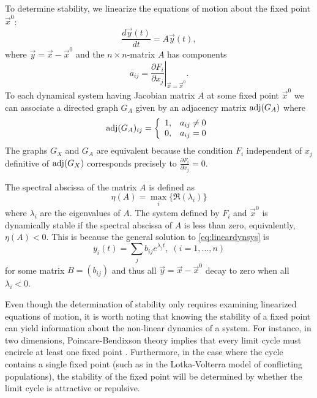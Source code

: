 To determine stability, we linearize the equations of motion about the
fixed point $\vec{x}^0$:
\begin{equation}\label{eq:lineardynsys}
\frac{d\vec{y}(t)}{dt} = A \vec{y}(t),
\end{equation}
where $\vec{y} = \vec{x} - \vec{x}^0$ and the $n \times n$-matrix $A$ has components
$$
a_{ij} = \left. \frac{\partial F_i}{\partial x_j} \right|_{\vec{x} = \vec{x}^0}.
$$
To each dynamical system having Jacobian matrix $A$ at some fixed point $\vec{x}^0$ we can associate a directed graph $G_A$ given by an adjacency matrix $\mathrm{adj}(G_A)$ where
 \begin{displaymath}
   \mathrm{adj}(G_A)_{ij} = \left\{
     \begin{array}{lr}
       1, & a_{ij} \neq 0\\
       0, & a_{ij} = 0
     \end{array}
   \right.
\end{displaymath}
The graphs $G_X$ and $G_A$ are equivalent because the condition $F_i$ independent of $x_j$ definitive of $\mathrm{adj}(G_X)$ corresponds precisely to $\frac{\partial F_i}{\partial x_j}=0$.

The spectral abscissa of the matrix $A$ is defined as
$$
\eta(A) = \max_i \{\Re(\lambda_i)\}
$$
where $\lambda_i$ are the eigenvalues of $A$. The system defined by $F_i$ and $\vec{x}^0$ is dynamically stable if the spectral abscissa of $A$ is less than zero, equivalently, $\eta(A) < 0$. This is because the general solution to \ref{eq:lineardynsys} is
$$
y_i(t) = \sum_j b_{ij} e^{\lambda_j t}, \; (i=1,\ldots,n)
$$
for some matrix $B=(b_{ij})$ and thus all $\vec{y} = \vec{x} - \vec{x}^0$ decay to zero when all $\lambda_i < 0$.

Even though the determination of stability only requires examining
linearized equations of motion, it is worth noting that knowing the
stability of a fixed point can yield information about the non-linear
dynamics of a system.  For instance, in two dimensions,
Poincare-Bendixson theory implies that every limit cycle must encircle
at least one fixed point \cite{Davis1962}.  Furthermore, in the case where the cycle contains a single fixed point (such as in the Lotka-Volterra model of
conflicting populations), the stability of the fixed point will be
determined by whether the limit cycle is attractive or repulsive.


